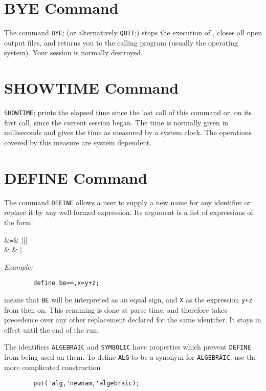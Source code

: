 \hypertarget{command:QUIT}{}
\hypertarget{command:BYE}{\section{BYE Command}}

The command \texttt{BYE}; (or alternatively \texttt{QUIT};)
stops the execution
of {\REDUCE}, closes all open output files, and returns you to the calling
program (usually the operating system).  Your {\REDUCE} session is
normally destroyed.

\section{SHOWTIME Command}
\hypertarget{command:SHOWTIME}{}

\texttt{SHOWTIME}; prints the elapsed time since the last call of this
command or, on its first call, since the current {\REDUCE} session began.
The time is normally given in milliseconds and gives the time as measured
by a system clock.  The operations covered by this measure are system
dependent.

\section{DEFINE Command}
\hypertarget{command:DEFINE}{}

The command \texttt{DEFINE} allows a user to supply a new name for
any identifier or replace it by any well-formed expression.  Its argument
is a list of expressions of the form
\begin{syntaxtable}
   &\texttt{=}& |||\\
                    &          & |
\end{syntaxtable}

\textit{Example:}
\begin{verbatim}
        define be==,x=y+z;
\end{verbatim}
means that \texttt{BE} will be interpreted as an equal sign, and \texttt{X}
as the expression \texttt{y+z} from then on.  This renaming is done at parse
time, and therefore takes precedence over any other replacement declared
for the same identifier.  It stays in effect until the end of the
{\REDUCE} run.

The identifiers \texttt{ALGEBRAIC} and \texttt{SYMBOLIC} have properties which
prevent \texttt{DEFINE} from being used on them.  To define
\texttt{ALG} to be a synonym for \texttt{ALGEBRAIC}, use the more complicated
construction
\begin{verbatim}
        put('alg,'newnam,'algebraic);
\end{verbatim}
